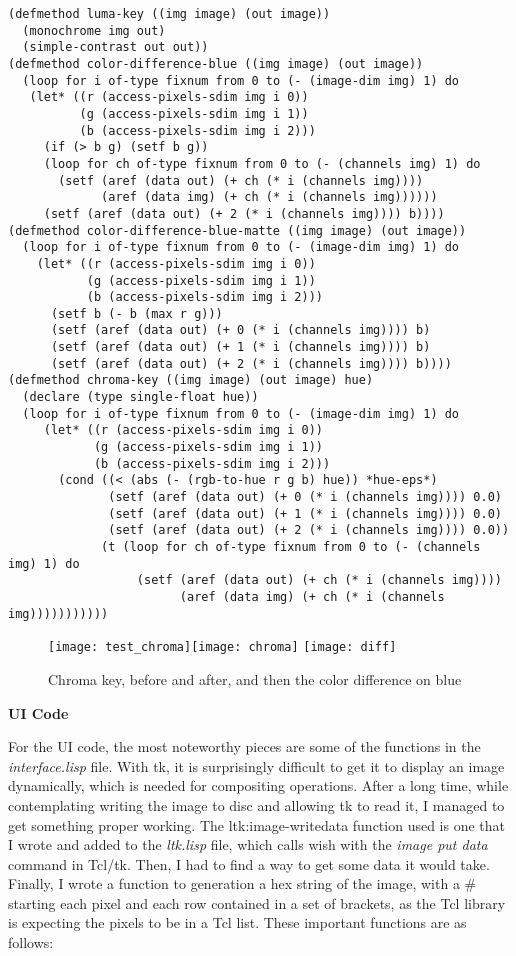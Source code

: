 \documentclass[11pt]{report}
\begin{document}
\begin{lstlisting}
(defmethod luma-key ((img image) (out image))
  (monochrome img out)
  (simple-contrast out out))
(defmethod color-difference-blue ((img image) (out image))
  (loop for i of-type fixnum from 0 to (- (image-dim img) 1) do
   (let* ((r (access-pixels-sdim img i 0))
          (g (access-pixels-sdim img i 1))
          (b (access-pixels-sdim img i 2)))
     (if (> b g) (setf b g))
     (loop for ch of-type fixnum from 0 to (- (channels img) 1) do
       (setf (aref (data out) (+ ch (* i (channels img))))
             (aref (data img) (+ ch (* i (channels img))))))
     (setf (aref (data out) (+ 2 (* i (channels img)))) b))))
(defmethod color-difference-blue-matte ((img image) (out image))
  (loop for i of-type fixnum from 0 to (- (image-dim img) 1) do
    (let* ((r (access-pixels-sdim img i 0))
           (g (access-pixels-sdim img i 1))
           (b (access-pixels-sdim img i 2)))
      (setf b (- b (max r g)))
      (setf (aref (data out) (+ 0 (* i (channels img)))) b)
      (setf (aref (data out) (+ 1 (* i (channels img)))) b)
      (setf (aref (data out) (+ 2 (* i (channels img)))) b))))
(defmethod chroma-key ((img image) (out image) hue)
  (declare (type single-float hue))
  (loop for i of-type fixnum from 0 to (- (image-dim img) 1) do
     (let* ((r (access-pixels-sdim img i 0))
            (g (access-pixels-sdim img i 1))
            (b (access-pixels-sdim img i 2)))
       (cond ((< (abs (- (rgb-to-hue r g b) hue)) *hue-eps*)
              (setf (aref (data out) (+ 0 (* i (channels img)))) 0.0)
              (setf (aref (data out) (+ 1 (* i (channels img)))) 0.0)
              (setf (aref (data out) (+ 2 (* i (channels img)))) 0.0))
             (t (loop for ch of-type fixnum from 0 to (- (channels img) 1) do
                  (setf (aref (data out) (+ ch (* i (channels img))))
                        (aref (data img) (+ ch (* i (channels img)))))))))))
\end{lstlisting}

\begin{figure}[h!]
\centering
    \texttt{[image: test\_chroma]}\texttt{[image: chroma]}
    \texttt{[image: diff]}
\caption{Chroma key, before and after, and then the color difference on blue}
\end{figure}

\bigskip
\textbf{UI Code}

For the UI code, the most noteworthy pieces are some of the functions in the
{\it interface.lisp} file. With tk, it is surprisingly difficult to get it
to display an image dynamically, which is needed for compositing operations.
After a long time, while contemplating writing the image to disc and allowing
tk to read it, I managed to get something proper working. The
ltk:image-writedata function used is one that I wrote and added to the
{\it ltk.lisp} file, which calls wish with the {\it image put data} command in
Tcl/tk. Then, I had to find a way to get some data it would take. Finally, I
wrote a function to generation a hex string of the image, with a \# starting
each pixel and each row contained in a set of brackets, as the Tcl library is
expecting the pixels to be in a Tcl list. These important functions are as
follows:
\end{document}
